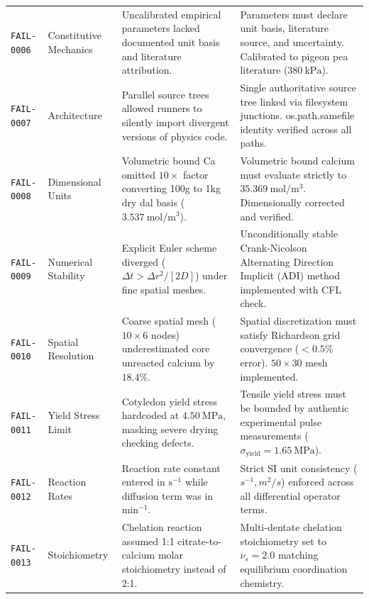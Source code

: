 \documentclass[10pt,a4paper]{article}
\begin{document}
\begin{longtable}{p{1.7cm}p{3.2cm}p{4.2cm}>{\raggedright\arraybackslash}p{6.5cm}}
\texttt{FAIL-0006} & Constitutive Mechanics & Uncalibrated empirical parameters lacked documented unit basis and literature attribution. & Parameters must declare unit basis, literature source, and uncertainty. Calibrated to pigeon pea literature ($380\ \mathrm{kPa}$). \\

\texttt{FAIL-0007} & Architecture & Parallel source trees allowed runners to silently import divergent versions of physics code. & Single authoritative source tree linked via filesystem junctions. os.path.samefile identity verified across all paths. \\

\texttt{FAIL-0008} & Dimensional Units & Volumetric bound Ca omitted $10\times$ factor converting 100g to 1kg dry dal basis ($3.537\ \mathrm{mol/m^3}$). & Volumetric bound calcium must evaluate strictly to $35.369\ \mathrm{mol/m^3}$. Dimensionally corrected and verified. \\

\texttt{FAIL-0009} & Numerical Stability & Explicit Euler scheme diverged ($\Delta t > \Delta r^2 / [2 D]$) under fine spatial meshes. & Unconditionally stable Crank-Nicolson Alternating Direction Implicit (ADI) method implemented with CFL check. \\

\texttt{FAIL-0010} & Spatial Resolution & Coarse spatial mesh ($10 \times 6$ nodes) underestimated core unreacted calcium by $18.4\%$. & Spatial discretization must satisfy Richardson grid convergence ($< 0.5\%$ error). $50 \times 30$ mesh implemented. \\

\texttt{FAIL-0011} & Yield Stress Limit & Cotyledon yield stress hardcoded at $4.50\ \mathrm{MPa}$, masking severe drying checking defects. & Tensile yield stress must be bounded by authentic experimental pulse measurements ($\sigma_{\mathrm{yield}} = 1.65\ \mathrm{MPa}$). \\

\texttt{FAIL-0012} & Reaction Rates & Reaction rate constant entered in $\mathrm{s^{-1}}$ while diffusion term was in $\mathrm{min^{-1}}$. & Strict SI unit consistency ($s^{-1}, m^2/s$) enforced across all differential operator terms. \\

\texttt{FAIL-0013} & Stoichiometry & Chelation reaction assumed 1:1 citrate-to-calcium molar stoichiometry instead of 2:1. & Multi-dentate chelation stoichiometry set to $\nu_s = 2.0$ matching equilibrium coordination chemistry. \\


\end{longtable}
\end{document}
